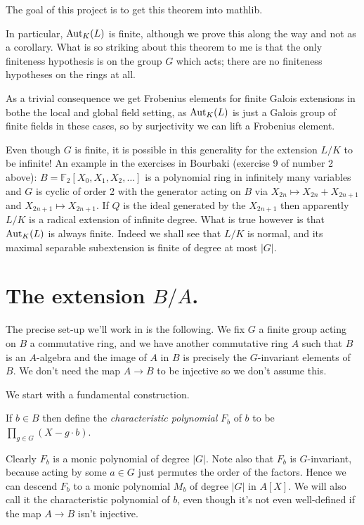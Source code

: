 The goal of this project is to get this theorem into mathlib.

In particular, $\operatorname{Aut}_K(L)$ is finite, although we prove this along the way and not
as a corollary. What is so striking about this theorem to me is that the only finiteness hypothesis
is on the group $G$ which acts; there are no finiteness hypotheses on the rings at all.

As a trivial consequence we get Frobenius elements for finite Galois extensions in bothe
the local and global field setting, as $\operatorname{Aut}_K(L)$ is just a Galois group of finite fields
in these cases, so by surjectivity we can lift a Frobenius element.

Even though $G$ is finite, it is possible in this generality for the extension $L/K$ to be infinite!
An example in the exercises in Bourbaki (exercise 9 of number 2 above):
$B=\mathbb{F}_2[X_0,X_1,X_2,\ldots]$
is a polynomial ring in infinitely many variables and $G$ is cyclic of order 2 with
the generator acting on $B$ via $X_{2n}\mapsto X_{2n}+X_{2n+1}$ and $X_{2n+1}\mapsto X_{2n+1}$.
If $Q$ is the ideal generated by the $X_{2n+1}$ then apparently $L/K$ is a radical extension of
infinite degree. What is true however is that $\operatorname{Aut}_K(L)$ is always finite. Indeed we shall
see that $L/K$ is normal, and its maximal separable subextension is finite of degree
at most $|G|$.

\section{The extension $B/A$.}

The precise set-up we'll work in is the following. We fix $G$ a finite group acting
on $B$ a commutative ring, and we have another commutative ring $A$ such
that $B$ is an $A$-algebra and the image of $A$ in $B$ is precisely the $G$-invariant
elements of $B$. We don't need the map $A\to B$ to be injective so we don't assume this.

We start with a fundamental construction.

\begin{definition}
  \label{MulSemiringAction.CharacteristicPolynomial.F}
  \leanok
  If $b\in B$ then define the \emph{characteristic polynomial}
  $F_b$ of $b$ to be $\prod_{g\in G}(X-g\cdot b)$.
\end{definition}

Clearly $F_b$ is a monic polynomial of degree $|G|$. Note also
that $F_b$ is $G$-invariant, because acting by some $a\in G$
just permutes the order of the factors. Hence we can descend $F_b$
to a monic polynomial $M_b$ of degree $|G|$ in $A[X]$. We will
also call it the characteristic polynomial of $b$, even though
it's not even well-defined if the map $A\to B$ isn't injective.

